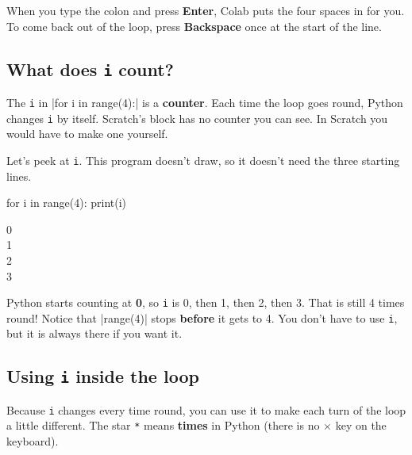 \begin{think}
When you type the colon and press \textbf{Enter}, Colab puts the four spaces in for you. To come back out of the loop, press \textbf{Backspace} once at the start of the line.
\end{think}

\subsection*{What does \texttt{i} count?}

The \texttt{i} in \py|for i in range(4):| is a \textbf{counter}. Each time the loop goes round, Python changes \texttt{i} by itself. Scratch's  block has no counter you can see. In Scratch you would have to make one yourself.

Let's peek at \texttt{i}. This program doesn't draw, so it doesn't need the three starting lines.

\begin{tcbraster}[raster columns=2, raster equal height=rows, raster column skip=12pt, raster valign=center]
\begin{code}
for i in range(4):
    print(i)
\end{code}
\begin{outputbox}
0\\
1\\
2\\
3
\end{outputbox}
\end{tcbraster}

Python starts counting at \textbf{0}, so \texttt{i} is 0, then 1, then 2, then 3. That is still 4 times round! Notice that \py|range(4)| stops \textbf{before} it gets to 4. You don't have to use \texttt{i}, but it is always there if you want it.

\subsection*{Using \texttt{i} inside the loop}

Because \texttt{i} changes every time round, you can use it to make each turn of the loop a little different. The star \texttt{*} means \textbf{times} in Python (there is no $\times$ key on the keyboard).

